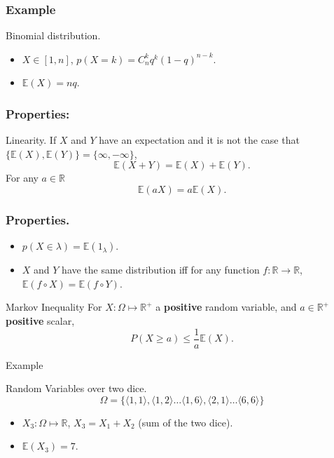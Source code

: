 \documentclass{beamer}
\begin{document}
\begin{frame}
  \frametitle{Example}
  \begin{exampleblock}{Binomial distribution.}
    \begin{itemize}
    \item $X \in [1,n]$, $p(X = k) = C^k_n q^k(1-q)^{n-k}$.
    \item $\mathbb{E}(X) = nq$.
    \end{itemize}
  \end{exampleblock}
\end{frame}

\begin{frame}
  \frametitle{Properties:}
  \begin{block}{Linearity.}
    If $X$ and $Y$ have an expectation and it is not the case that $\{\mathbb{E}(X), \mathbb{E}(Y)\} = \{\infty, {-}\infty\}$,
    \[ \mathbb{E}(X + Y) = \mathbb{E}(X) + \mathbb{E}(Y). \]
    For any $a \in \mathbb{R}$
    \[\mathbb{E}(aX) = a\mathbb{E}(X).\]
  \end{block}
\end{frame}

\begin{frame}
  \frametitle{Properties.}
  \begin{itemize}
  \item $p(X \in \lambda) = \mathbb{E}(1_{\lambda})$.
  \item $X$ and $Y$ have the same distribution iff for any function $f: \mathbb{R} \rightarrow \mathbb{R}$, $\mathbb{E}(f \circ X) = \mathbb{E}(f \circ Y)$.
  \end{itemize}

  \begin{block}{Markov Inequality}
      For $X: \Omega \mapsto \mathbb{R}^{+}$ a {\bf positive} random variable, and $a \in \mathbb{R}^{+}$ {\bf positive} scalar,
      \[P(X \ge a) \le \frac{1}{a}\mathbb{E}(X).\]
  \end{block}
  
\end{frame}

\begin{frame}{Example}
  \begin{exampleblock}{Random Variables over two dice.}
    \[\Omega = \{\langle 1,1 \rangle, \langle 1,2 \rangle \dots \langle 1,6 \rangle, \langle 2,1 \rangle \dots \langle 6,6 \rangle\}\]
    \begin{itemize}
    \item $X_3: \Omega \mapsto \mathbb{R}$, $X_3 = X_1 + X_2$ (sum of the two dice).
    \item $\mathbb{E}(X_3) = 7$.
    \end{itemize}
  \end{exampleblock}
\end{frame}
\end{document}
